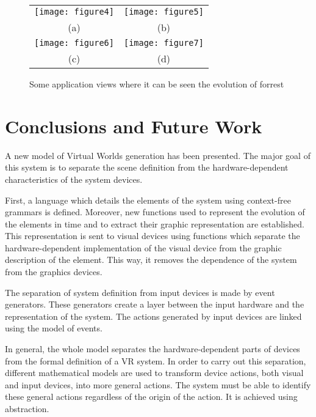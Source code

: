 \documentclass[twocolumn]{svjour3}
\begin{document}
\begin{figure}[htb]
    \begin{tabular}{cc}
        \texttt{[image: figure4]} &
        \texttt{[image: figure5]} \\
        \small{(a)} & \small{(b)} \\
        \texttt{[image: figure6]} &
        \texttt{[image: figure7]} \\
        \small{(c)} & \small{(d)} \\
    \end{tabular}
    \caption{\label{fig:programView}
    Some application views where it can be seen the evolution of forrest}
\end{figure}


\section{Conclusions and Future Work
\label{sec:conclusions}}

A new model of Virtual Worlds generation has been presented. The major goal of this system is to
separate the scene definition from the hardware-dependent characteristics of the system devices.

First, a language which details the elements of the system using context-free grammars is defined.
Moreover, new functions used to represent the evolution of the elements in time and to extract
their graphic representation are established. This representation is sent to visual devices using
functions which separate the  hardware-dependent implementation of the visual device from the
graphic description of the element. This way, it removes the dependence of the system from the
graphics devices.

The separation of system definition from input devices is made by event generators. These
generators create a layer between the input hardware and the representation of the system. The
actions generated by input devices are linked using the model of events.

In general, the whole model separates the hardware-dependent parts of devices from the formal
definition of a VR system. In order to carry out this separation, different mathematical models are
used to transform device actions, both visual and input devices, into more general actions. The
system must be able to identify these general actions regardless of the origin of the action. It is
achieved using abstraction.
\end{document}
